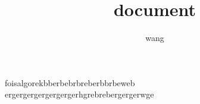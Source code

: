 \documentclass{article}
\author{wang}
\title{document}
\begin{document}
\maketitle
foisalgorekbberbebrbreberbbrbeweb\\
ergergergergergergerhgrebrebergergerwge
\end{document}

